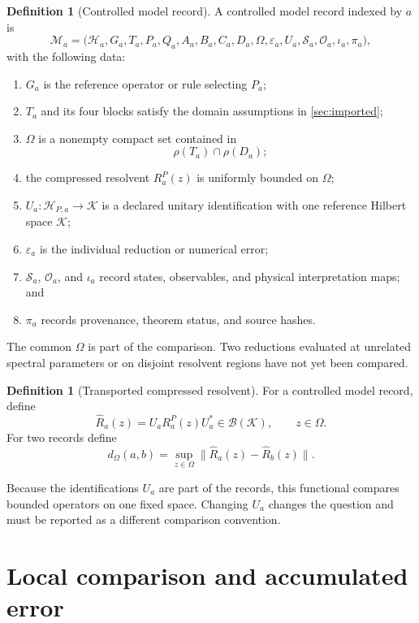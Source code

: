 \documentclass[11pt]{article}
\theoremstyle{definition}
\newtheorem{definition}[theorem]{Definition}
\theoremstyle{remark}
\newcommand{\cH}{\mathcal H}
\newcommand{\cK}{\mathcal K}
\newcommand{\cM}{\mathcal M}
\newcommand{\cO}{\mathcal O}
\newcommand{\cS}{\mathcal S}
\newcommand{\1}{\mathbf 1}
\begin{document}
\begin{definition}[Controlled model record]
\label{def:modelrecord}
A controlled model record indexed by \(a\) is
\[
\cM_a=
\bigl(
\cH_a,G_a,T_a,P_a,Q_a,
A_a,B_a,C_a,D_a,
\Omega,
\varepsilon_a,
U_a,
\cS_a,\cO_a,\iota_a,
\pi_a
\bigr),
\]
with the following data:
\begin{enumerate}[leftmargin=2em]
\item \(G_a\) is the reference operator or rule selecting \(P_a\);
\item \(T_a\) and its four blocks satisfy the domain assumptions in
      \cref{sec:imported};
\item \(\Omega\) is a nonempty compact set contained in
      \[
      \rho(T_a)\cap\rho(D_a);
      \]
\item the compressed resolvent \(R_a^P(z)\) is uniformly bounded on
      \(\Omega\);
\item \(U_a:\cH_{P,a}\to\cK\) is a declared unitary identification with
      one reference Hilbert space \(\cK\);
\item \(\varepsilon_a\) is the individual reduction or numerical error;
\item \(\cS_a\), \(\cO_a\), and \(\iota_a\) record states, observables,
      and physical interpretation maps; and
\item \(\pi_a\) records provenance, theorem status, and source hashes.
\end{enumerate}
\end{definition}

The common \(\Omega\) is part of the comparison.  Two reductions evaluated
at unrelated spectral parameters or on disjoint resolvent regions have not
yet been compared.

\begin{definition}[Transported compressed resolvent]
For a controlled model record, define
\[
 \widehat R_a(z)
 =
 U_a R_a^P(z)U_a^*
 \in\mathcal B(\cK),
 \qquad z\in\Omega.
\]
For two records define
\[
 d_\Omega(a,b)
 =
 \sup_{z\in\Omega}
 \|\widehat R_a(z)-\widehat R_b(z)\|.
\]
\end{definition}

Because the identifications \(U_a\) are part of the records, this
functional compares bounded operators on one fixed space.  Changing
\(U_a\) changes the question and must be reported as a different
comparison convention.

\section{Local comparison and accumulated error}
\label{sec:comparison}
\end{document}
